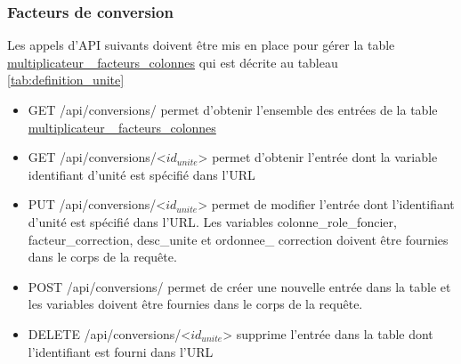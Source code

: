 \subsubsection{Facteurs de conversion}
Les appels d'\ac{API} suivants doivent être mis en place pour gérer la table \ul{multiplicateur\_ facteurs\_colonnes} qui est décrite au tableau \ref{tab:definition_unite}
\begin{itemize}
    \item GET /api/conversions/ permet d'obtenir l'ensemble des entrées de la table \ul{multiplicateur\_ facteurs\_colonnes}
    \item GET /api/conversions/<$id_{unite}$> permet d'obtenir l'entrée dont la variable identifiant d'unité est spécifié dans l'\ac{URL}
    \item PUT /api/conversions/<$id_{unite}$> permet de modifier l'entrée dont l'identifiant d'unité est spécifié dans l'\ac{URL}. Les variables colonne\_role\_foncier, facteur\_correction, desc\_unite et ordonnee\_ correction doivent être fournies dans le corps de la requête.
    \item POST /api/conversions/ permet de créer une nouvelle entrée dans la table et les variables doivent être fournies dans le corps de la requête.
    \item DELETE /api/conversions/<$id_{unite}$> supprime l'entrée dans la table dont l'identifiant est fourni dans l'\ac{URL}
\end{itemize}
